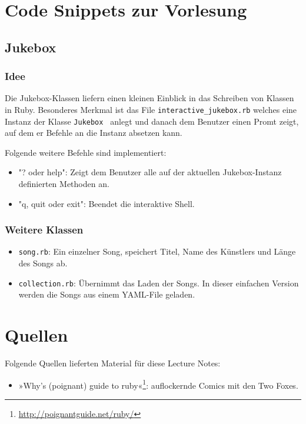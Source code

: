 \documentclass[a4book,11pt,twoside]{scrbook}
\begin{document}










\chapter{Code Snippets zur Vorlesung}

\section{Jukebox}
\subsection*{Idee}
Die Jukebox-Klassen liefern einen kleinen Einblick in das Schreiben von Klassen in Ruby. Besonderes Merkmal ist das File \texttt{interactive\_jukebox.rb} welches eine Instanz der Klasse \texttt{Jukebox	} anlegt und danach dem Benutzer einen Promt zeigt, auf dem er Befehle an die Instanz absetzen kann.

Folgende weitere Befehle sind implementiert:

\begin{itemize}
\item "? oder help": Zeigt dem Benutzer alle auf der aktuellen Jukebox-Instanz definierten Methoden an.
\item "q, quit oder exit": Beendet die interaktive Shell.
\end{itemize}


\subsection*{Weitere Klassen}

\begin{itemize}
\item \texttt{song.rb}: Ein einzelner Song, speichert Titel, Name des Künstlers und Länge des Songs ab.
\item \texttt{collection.rb}: Übernimmt das Laden der Songs. In dieser einfachen Version werden die Songs aus einem YAML-File geladen. 
\end{itemize}








\chapter*{Quellen} %
\label{cha:quellen}
Folgende Quellen lieferten Material für diese Lecture Notes:

\begin{itemize}
	\item »Why's (poignant) guide to ruby«\footnote{\url{http://poignantguide.net/ruby/}}: auflockernde Comics mit den Two Foxes.
\end{itemize}
\end{document}
